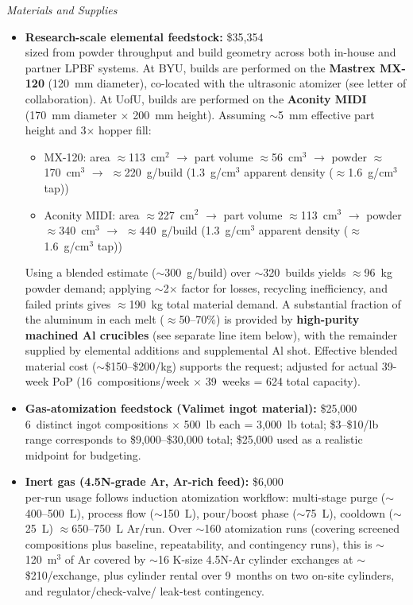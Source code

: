 \documentclass[11pt,letterpaper]{article}
\begin{document}
\textit{Materials and Supplies}
\begin{itemize}\setlength{\itemsep}{2pt}
\item \textbf{Research-scale elemental feedstock:} \$35,354 \\
sized from powder throughput and build geometry across both in-house
and partner LPBF systems. At BYU, builds are performed on the
\textbf{Mastrex MX-120} (120~mm diameter), co-located with the
ultrasonic atomizer (see letter of collaboration). At UofU, builds
are performed on the \textbf{Aconity MIDI} (170~mm diameter
$\times$ 200~mm height). Assuming $\sim$5~mm effective part height
and 3$\times$ hopper fill:
\begin{itemize}\setlength{\itemsep}{0pt}
  \item MX-120: area $\approx$113~cm$^2$ $\to$ part volume
  $\approx$56~cm$^3$ $\to$ powder $\approx$170~cm$^3$ $\to$
  $\approx$220~g/build (1.3~g/cm$^3$ apparent density
  ($\approx$1.6~g/cm$^3$ tap))
  \item Aconity MIDI: area $\approx$227~cm$^2$ $\to$ part volume
  $\approx$113~cm$^3$ $\to$ powder $\approx$340~cm$^3$ $\to$
  $\approx$440~g/build (1.3~g/cm$^3$ apparent density
  ($\approx$1.6~g/cm$^3$ tap))
\end{itemize}
Using a blended estimate ($\sim$300~g/build) over $\sim$320~builds
yields $\approx$96~kg powder demand; applying $\sim$2$\times$
factor for losses, recycling inefficiency, and failed prints gives
$\approx$190~kg total material demand. A substantial fraction of
the aluminum in each melt ($\approx$50--70\%) is provided by
\textbf{high-purity machined Al crucibles} (see separate line item
below), with the remainder supplied by elemental additions and
supplemental Al shot. Effective blended material cost
($\sim$\$150--\$200/kg) supports the request; adjusted for actual
39-week PoP (16~compositions/week $\times$ 39~weeks = 624 total
capacity).

\item \textbf{Gas-atomization feedstock (Valimet ingot material):}
\$25,000 \\
6~distinct ingot compositions $\times$ 500~lb each = 3,000~lb total;
\$3--\$10/lb range corresponds to \$9,000--\$30,000 total; \$25,000
used as a realistic midpoint for budgeting.

\item \textbf{Inert gas (4.5N-grade Ar, Ar-rich feed):} \$6,000 \\
per-run usage follows induction atomization workflow: multi-stage
purge ($\sim$400--500~L), process flow ($\sim$150~L), pour/boost
phase ($\sim$75~L), cooldown ($\sim$25~L) $\approx$650--750~L
Ar/run. Over $\sim$160 atomization runs (covering screened
compositions plus baseline, repeatability, and contingency runs),
this is $\sim$120~m$^3$ of Ar covered by $\sim$16 K-size 4.5N-Ar
cylinder exchanges at $\sim$\$210/exchange, plus cylinder rental
over 9~months on two on-site cylinders, and regulator/check-valve/
leak-test contingency.


\end{itemize}
\end{document}
